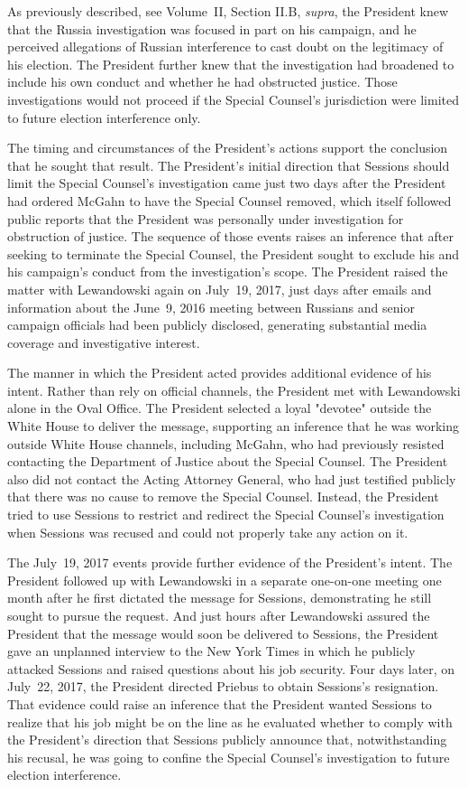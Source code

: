 As previously described, see Volume~II, Section II.B, \textit{supra}, the President knew that the Russia investigation was focused in part on his campaign, and he perceived allegations of Russian interference to cast doubt on the legitimacy of his election.
The President further knew that the investigation had broadened to include his own conduct and whether he had obstructed justice.
Those investigations would not proceed if the Special Counsel's jurisdiction were limited to future election interference only.

The timing and circumstances of the President's actions support the conclusion that he sought that result.
The President's initial direction that Sessions should limit the Special Counsel's investigation came just two days after the President had ordered McGahn to have the Special Counsel removed, which itself followed public reports that the President was personally under investigation for obstruction of justice.
The sequence of those events raises an inference that after seeking to terminate the Special Counsel, the President sought to exclude his and his campaign's conduct from the investigation's scope.
The President raised the matter with Lewandowski again on July~19, 2017, just days after emails and information about the June~9, 2016 meeting between Russians and senior campaign officials had been publicly disclosed, generating substantial media coverage and investigative interest.

The manner in which the President acted provides additional evidence of his intent.
Rather than rely on official channels, the President met with Lewandowski alone in the Oval Office.
The President selected a loyal "devotee" outside the White House to deliver the message, supporting an inference that he was working outside White House channels, including McGahn, who had previously resisted contacting the Department of Justice about the Special Counsel.
The President also did not contact the Acting Attorney General, who had just testified publicly that there was no cause to remove the Special Counsel.
Instead, the President tried to use Sessions to restrict and redirect the Special Counsel's investigation when Sessions was recused and could not properly take any action on it.

The July~19, 2017 events provide further evidence of the President's intent.
The President followed up with Lewandowski in a separate one-on-one meeting one month after he first dictated the message for Sessions, demonstrating he still sought to pursue the request.
And just hours after Lewandowski assured the President that the message would soon be delivered to Sessions, the President gave an unplanned interview to the New York Times in which he publicly attacked Sessions and raised questions about his job security.
Four days later, on July~22, 2017, the President directed Priebus to obtain Sessions's resignation.
That evidence could raise an inference that the President wanted Sessions to realize that his job might be on the line as he evaluated whether to comply with the President's direction that Sessions publicly announce that, notwithstanding his recusal, he was going to confine the Special Counsel's investigation to future election interference.

